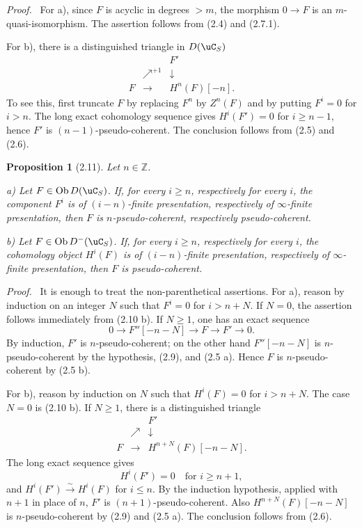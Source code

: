\documentclass[11pt]{article}
\theoremstyle{plain}
\newtheorem*{proposition*}{Proposition}
\theoremstyle{definition}
\theoremstyle{remark}
\newenvironment{prooftext}{\par\noindent\textit{Proof.}\ }{\par\medskip}
\newcommand{\ZZ}{\mathbb Z}
\DeclareMathOperator{\ob}{Ob}
\providecommand{\iso}{\xrightarrow{\sim}}
\begin{document}
\begin{prooftext}
For a), since $F$ is acyclic in degrees $>m$, the morphism $0\to F$ is an $m$-quasi-isomorphism. The assertion follows from (2.4) and (2.7.1).

For b), there is a distinguished triangle in $D(\uC_S)$
\[
\begin{array}{ccc}
&&F'\\
&\nearrow^{+1}&\downarrow\\
F&\longrightarrow&H^n(F)[-n].
\end{array}
\]
To see this, first truncate $F$ by replacing $F^n$ by $Z^n(F)$ and by putting $F^i=0$ for $i>n$. The long exact cohomology sequence gives $H^i(F')=0$ for $i\geq n-1$, hence $F'$ is $(n-1)$-pseudo-coherent. The conclusion follows from (2.5) and (2.6).
\end{prooftext}

\begin{proposition*}[2.11]
Let $n\in\ZZ$.

\textup{a)} Let $F\in\ob D(\uC_S)$. If, for every $i\geq n$, respectively for every $i$, the component $F^i$ is of $(i-n)$-finite presentation, respectively of $\infty$-finite presentation, then $F$ is $n$-pseudo-coherent, respectively pseudo-coherent.

\textup{b)} Let $F\in\ob D^-(\uC_S)$. If, for every $i\geq n$, respectively for every $i$, the cohomology object $H^i(F)$ is of $(i-n)$-finite presentation, respectively of $\infty$-finite presentation, then $F$ is pseudo-coherent.
\end{proposition*}

\begin{prooftext}
It is enough to treat the non-parenthetical assertions. For a), reason by induction on an integer $N$ such that $F^i=0$ for $i>n+N$. If $N=0$, the assertion follows immediately from (2.10 b). If $N\geq1$, one has an exact sequence
\[
0\longrightarrow F''[-n-N]\longrightarrow F\longrightarrow F'\longrightarrow0.
\]
By induction, $F'$ is $n$-pseudo-coherent; on the other hand $F''[-n-N]$ is $n$-pseudo-coherent by the hypothesis, (2.9), and (2.5 a). Hence $F$ is $n$-pseudo-coherent by (2.5 b).

For b), reason by induction on $N$ such that $H^i(F)=0$ for $i>n+N$. The case $N=0$ is (2.10 b). If $N\geq1$, there is a distinguished triangle
\[
\begin{array}{ccc}
&&F'\\
&\nearrow&\downarrow\\
F&\longrightarrow&H^{n+N}(F)[-n-N].
\end{array}
\]
The long exact sequence gives
\[
H^i(F')=0\quad\text{for }i\geq n+1,
\]
and $H^i(F')\iso H^i(F)$ for $i\leq n$. By the induction hypothesis, applied with $n+1$ in place of $n$, $F'$ is $(n+1)$-pseudo-coherent. Also $H^{n+N}(F)[-n-N]$ is $n$-pseudo-coherent by (2.9) and (2.5 a). The conclusion follows from (2.6).
\end{prooftext}
\end{document}
